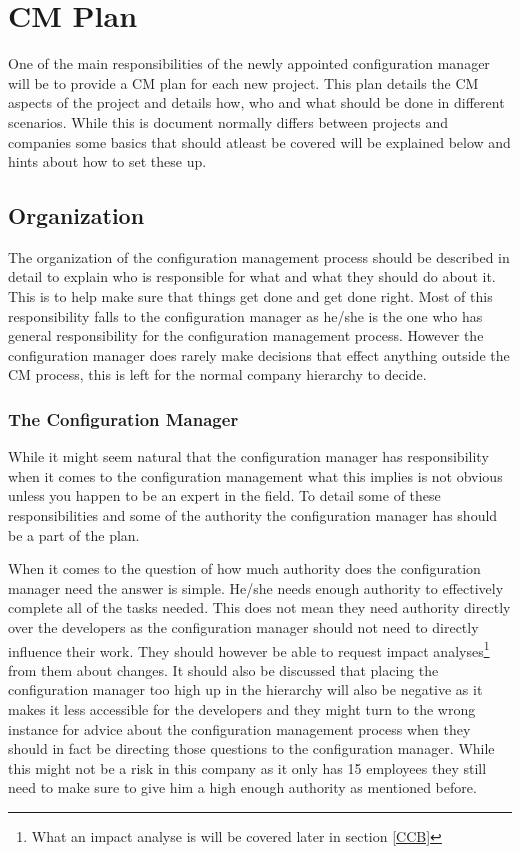 \documentclass[a4paper]{article}
\begin{document}
\section{CM Plan}
One of the main responsibilities of the newly appointed configuration manager will be to provide a CM plan for each new project. This plan details the CM aspects of the project and details how, who and what should be done in different scenarios. While this is document normally differs between projects and companies some basics that should atleast be covered will be explained below and hints about how to set these up. 

\subsection{Organization}
The organization of the configuration management process should be described in detail to explain who is responsible for what and what they should do about it. This is to help make sure that things get done and get done right. Most of this responsibility falls to the configuration manager as he/she is the one who has general responsibility for the configuration management process. However the configuration manager does rarely make decisions that effect anything outside the CM process, this is left for the normal company hierarchy to decide.

\subsubsection{The Configuration Manager}
While it might seem natural that the configuration manager has responsibility when it comes to the configuration management what this implies is not obvious unless you happen to be an expert in the field. To detail some of these responsibilities and some of the authority the configuration manager has should be a part of the plan.

When it comes to the question of how much authority does the configuration manager need the answer is simple. He/she needs enough authority to effectively complete all of the tasks needed. This does not mean they need authority directly over the developers as the configuration manager should not need to directly influence their work. They should however be able to request impact analyses\footnote{What an impact analyse is will be covered later in section \ref{CCB}} from them about changes. It should also be discussed that placing the configuration manager too high up in the hierarchy will also be negative as it makes it less accessible for the developers and they might turn to the wrong instance for advice about the configuration management process when they should in fact be directing those questions to the configuration manager.\cite{daniels} While this might not be a risk in this company as it only has 15 employees they still need to make sure to give him a high enough authority as mentioned before.
\end{document}

